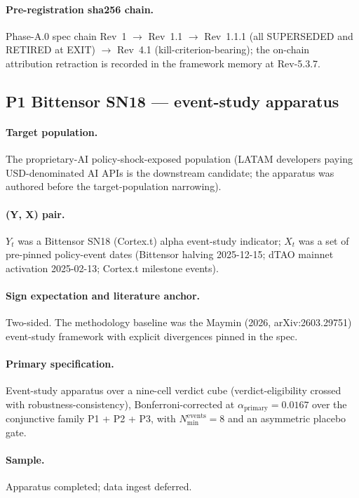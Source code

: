 \paragraph{Pre-registration sha256 chain.} Phase-A.0 spec chain
Rev~1 \(\to\) Rev~1.1 \(\to\) Rev~1.1.1 (all SUPERSEDED and RETIRED at
EXIT) \(\to\) Rev~4.1 (kill-criterion-bearing); the on-chain attribution
retraction is recorded in the framework memory at Rev-5.3.7.

\subsection{P1 Bittensor SN18 --- event-study apparatus}\label{sec:6.5}

\paragraph{Target population.} The proprietary-AI policy-shock-exposed
population (LATAM developers paying USD-denominated AI APIs is the
downstream candidate; the apparatus was authored before the
target-population narrowing).

\paragraph{(Y, X) pair.} \(Y_t\) was a Bittensor SN18 (Cortex.t) alpha
event-study indicator; \(X_t\) was a set of pre-pinned policy-event
dates (Bittensor halving 2025-12-15; dTAO mainnet activation 2025-02-13;
Cortex.t milestone events).

\paragraph{Sign expectation and literature anchor.} Two-sided. The
methodology baseline was the Maymin (2026, arXiv:2603.29751)
event-study framework with explicit divergences pinned in the spec.

\paragraph{Primary specification.} Event-study apparatus over a
nine-cell verdict cube (verdict-eligibility crossed with
robustness-consistency), Bonferroni-corrected at
\(\alpha_{\mathrm{primary}} = 0.0167\) over the conjunctive family
P1 + P2 + P3, with \(N_{\min}^{\mathrm{events}} = 8\) and an
asymmetric placebo gate.

\paragraph{Sample.} Apparatus completed; data ingest deferred.

